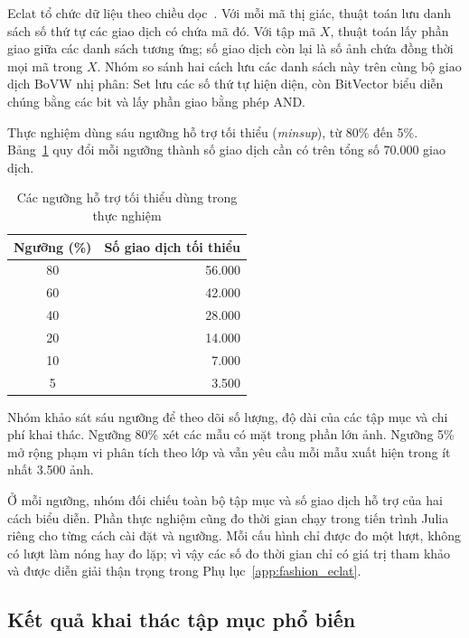 Eclat tổ chức dữ liệu theo chiều dọc~\cite{Zaki2000}. Với mỗi mã thị giác, thuật toán lưu danh sách số thứ tự các giao dịch có chứa mã đó. Với tập mã $X$, thuật toán lấy phần giao giữa các danh sách tương ứng; số giao dịch còn lại là số ảnh chứa đồng thời mọi mã trong $X$. Nhóm so sánh hai cách lưu các danh sách này trên cùng bộ giao dịch BoVW nhị phân: Set lưu các số thứ tự hiện diện, còn BitVector biểu diễn chúng bằng các bit và lấy phần giao bằng phép AND.

Thực nghiệm dùng sáu ngưỡng hỗ trợ tối thiểu (\textit{minsup}), từ 80\% đến 5\%. Bảng~\ref{tab:fim_minsup} quy đổi mỗi ngưỡng thành số giao dịch cần có trên tổng số 70.000 giao dịch.

\begin{table}[!t]
    \centering
    \caption{Các ngưỡng hỗ trợ tối thiểu dùng trong thực nghiệm}
    \label{tab:fim_minsup}
    \begin{tabular}{c r}
        \hline
        \textbf{Ngưỡng (\%)} & \textbf{Số giao dịch tối thiểu} \\
        \hline
        80 & 56.000 \\
        60 & 42.000 \\
        40 & 28.000 \\
        20 & 14.000 \\
        10 &  7.000 \\
         5 &  3.500 \\
        \hline
    \end{tabular}
\end{table}

Nhóm khảo sát sáu ngưỡng để theo dõi số lượng, độ dài của các tập mục và chi phí khai thác. Ngưỡng 80\% xét các mẫu có mặt trong phần lớn ảnh. Ngưỡng 5\% mở rộng phạm vi phân tích theo lớp và vẫn yêu cầu mỗi mẫu xuất hiện trong ít nhất 3.500 ảnh.

Ở mỗi ngưỡng, nhóm đối chiếu toàn bộ tập mục và số giao dịch hỗ trợ của hai cách biểu diễn. Phần thực nghiệm cũng đo thời gian chạy trong tiến trình Julia riêng cho từng cách cài đặt và ngưỡng. Mỗi cấu hình chỉ được đo một lượt, không có lượt làm nóng hay đo lặp; vì vậy các số đo thời gian chỉ có giá trị tham khảo và được diễn giải thận trọng trong Phụ lục~\ref{app:fashion_eclat}.

\subsection{Kết quả khai thác tập mục phổ biến}
\label{subsec:fashion_fim_results}

